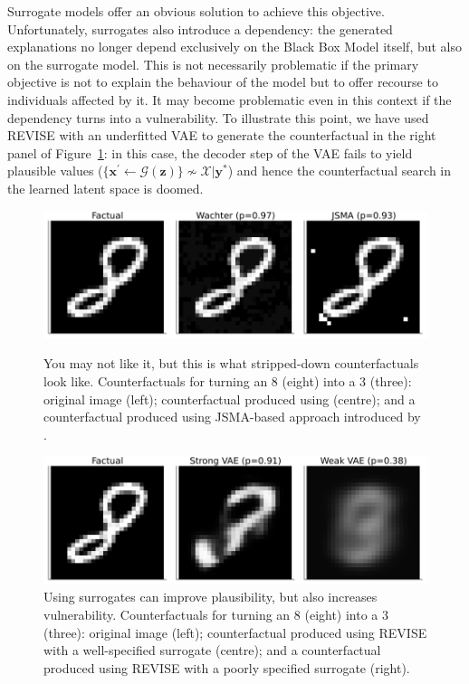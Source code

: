 \documentclass{article}
\begin{document}
Surrogate models offer an obvious solution to achieve this objective. Unfortunately, surrogates also introduce a dependency: the generated explanations no longer depend exclusively on the Black Box Model itself, but also on the surrogate model. This is not necessarily problematic if the primary objective is not to explain the behaviour of the model but to offer recourse to individuals affected by it. It may become problematic even in this context if the dependency turns into a vulnerability. To illustrate this point, we have used REVISE \citep{joshi2019realistic} with an underfitted VAE to generate the counterfactual in the right panel of Figure~\ref{fig:vae}: in this case, the decoder step of the VAE fails to yield plausible values ($\{\mathbf{x}^{\prime} \leftarrow \mathcal{G}(\mathbf{z})\} \not\sim \mathcal{X}|\mathbf{y}^*$) and hence the counterfactual search in the learned latent space is doomed.

\begin{figure}
  \centering
  \begin{minipage}[t]{0.45\textwidth}
    \centering
    \includegraphics[width=\textwidth]{../www/you_may_not_like_it.png}
    \caption{You may not like it, but this is what stripped-down counterfactuals look like. Counterfactuals for turning an 8 (eight) into a 3 (three): original image (left); counterfactual produced using \citet{wachter2017counterfactual} (centre); and a counterfactual produced using JSMA-based approach introduced by \citep{schut2021generating}.}\label{fig:adv}
  \end{minipage}\hfill
  \begin{minipage}[t]{0.45\textwidth}
    \centering
    \includegraphics[width=\textwidth]{../www/surrogate_gone_wrong.png}
    \caption{Using surrogates can improve plausibility, but also increases vulnerability. Counterfactuals for turning an 8 (eight) into a 3 (three): original image (left); counterfactual produced using REVISE \citep{joshi2019realistic} with a well-specified surrogate (centre); and a counterfactual produced using REVISE \citep{joshi2019realistic} with a poorly specified surrogate (right).}\label{fig:vae}
  \end{minipage}
\end{figure}
\end{document}
